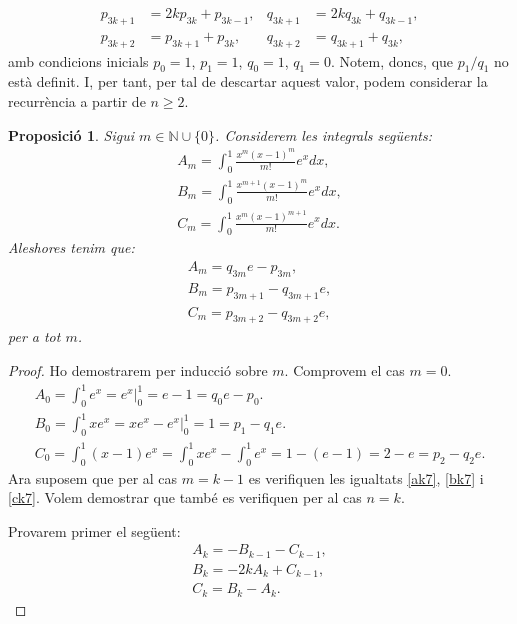 \documentclass[11pt,a4paper]{article}
\newtheorem{prop}{Proposició}
\theoremstyle{definition}
\begin{document}
\begin{enumerate}
\begin{align*}
              p_{3k+1} & =2kp_{3k}+p_{3k-1}, & q_{3k+1} & =2kq_{3k}+q_{3k-1}, \\
              p_{3k+2} & =p_{3k+1}+p_{3k},   & q_{3k+2} & =q_{3k+1}+q_{3k},
          \end{align*}
          amb condicions inicials $p_0=1$, $p_1=1$, $q_0=1$, $q_1=0$. Notem, doncs, que $p_1/q_1$ no està definit. I, per tant, per tal de descartar aquest valor, podem considerar la recurrència a partir de $n\geq 2$.
          \begin{prop}
              Sigui $m\in\mathbb{N}\cup\{0\}$. Considerem les integrals següents:
              \begin{gather}
                  A_m=\int_0^1\frac{x^m(x-1)^m}{m!}e^xdx,\\ B_m=\int_0^1\frac{x^{m+1}(x-1)^m}{m!}e^xdx,\\ C_m=\int_0^1\frac{x^m(x-1)^{m+1}}{m!}e^xdx.
              \end{gather}
              Aleshores tenim que:
              \begin{gather}
                  \label{ak7}A_m=q_{3m}e-p_{3m},\\
                  \label{bk7}B_m=p_{3m+1}-q_{3m+1}e,\\
                  \label{ck7}C_m=p_{3m+2}-q_{3m+2}e,
              \end{gather}
              per a tot $m$.
          \end{prop}
          \begin{proof}
              Ho demostrarem per inducció sobre $m$. Comprovem el cas $m=0$.
              \begin{gather*}
                  A_0=\int_0^1e^x=e^x\Big|_0^1=e-1=q_0e-p_0.\\
                  B_0=\int_0^1xe^x=xe^x-e^x\Big|_0^1=1=p_1-q_1e.\\
                  C_0=\int_0^1(x-1)e^x=\int_0^1xe^x-\int_0^1e^x=1-(e-1)=2-e=p_2-q_2e.
              \end{gather*}
              Ara suposem que per al cas $m=k-1$ es verifiquen les igualtats \eqref{ak7}, \eqref{bk7} i \eqref{ck7}. Volem demostrar que també es verifiquen per al cas $n=k$.\par Provarem primer el següent:
              \begin{gather}
                  \label{ak}A_k=-B_{k-1}-C_{k-1},\\
                  \label{bk}B_k=-2kA_k+C_{k-1},\\
                  \label{ck}C_k=B_k-A_k.

\end{gather}
\end{proof}
\end{enumerate}
\end{document}
